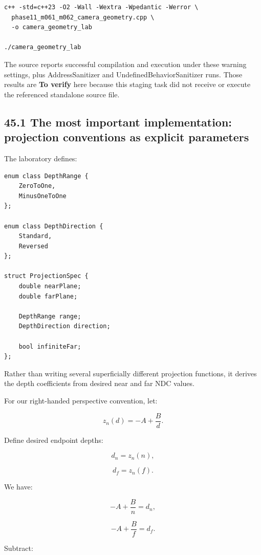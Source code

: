 \begin{verbatim}
c++ -std=c++23 -O2 -Wall -Wextra -Wpedantic -Werror \
  phase11_m061_m062_camera_geometry.cpp \
  -o camera_geometry_lab

./camera_geometry_lab
\end{verbatim}

The source reports successful compilation and execution under these warning settings, plus AddressSanitizer and UndefinedBehaviorSanitizer runs. Those results are \textbf{To verify} here because this staging task did not receive or execute the referenced standalone source file.

\subsection{45.1 The most important implementation: projection conventions as explicit parameters}\label{02-foundations-ii-ch037-the-most-important-implementation-projection-conventions-as-explicit-parameters}

\hypertarget{02-foundations-ii-ch037-the-most-important-implementation-projection-conventions-as-explicit-parameters}{}

The laboratory defines:

\begin{verbatim}
enum class DepthRange {
    ZeroToOne,
    MinusOneToOne
};

enum class DepthDirection {
    Standard,
    Reversed
};

struct ProjectionSpec {
    double nearPlane;
    double farPlane;

    DepthRange range;
    DepthDirection direction;

    bool infiniteFar;
};
\end{verbatim}

Rather than writing several superficially different projection functions, it derives the depth coefficients from desired near and far NDC values.

For our right-handed perspective convention, let:

\[
 z_n(d)=-A+\frac Bd.
\]

Define desired endpoint depths:

\[
 d_n=z_n(n),
\]

\[
 d_f=z_n(f).
\]

We have:

\[
 -A+\frac Bn=d_n,
\]

\[
 -A+\frac Bf=d_f.
\]

Subtract:

